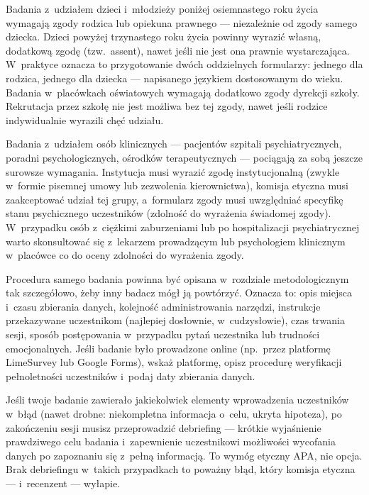 \documentclass[12pt,a4paper,twoside,openany]{book}
\begin{document}
Badania z~udziałem dzieci i~młodzieży poniżej osiemnastego roku życia wymagają zgody rodzica lub opiekuna prawnego --- niezależnie od zgody samego dziecka. Dzieci powyżej trzynastego roku życia powinny wyrazić własną, dodatkową zgodę (tzw.\ assent), nawet jeśli nie jest ona prawnie wystarczająca. W~praktyce oznacza to przygotowanie dwóch oddzielnych formularzy: jednego dla rodzica, jednego dla dziecka --- napisanego językiem dostosowanym do wieku. Badania w~placówkach oświatowych wymagają dodatkowo zgody dyrekcji szkoły. Rekrutacja przez szkołę nie jest możliwa bez tej zgody, nawet jeśli rodzice indywidualnie wyrazili chęć udziału.

Badania z~udziałem osób klinicznych --- pacjentów szpitali psychiatrycznych, poradni psychologicznych, ośrodków terapeutycznych --- pociągają za sobą jeszcze surowsze wymagania. Instytucja musi wyrazić zgodę instytucjonalną (zwykle w~formie pisemnej umowy lub zezwolenia kierownictwa), komisja etyczna musi zaakceptować udział tej grupy, a~formularz zgody musi uwzględniać specyfikę stanu psychicznego uczestników (zdolność do wyrażenia świadomej zgody). W~przypadku osób z~ciężkimi zaburzeniami lub po hospitalizacji psychiatrycznej warto skonsultować się z~lekarzem prowadzącym lub psychologiem klinicznym w~placówce co do oceny zdolności do wyrażenia zgody.

Procedura samego badania powinna być opisana w~rozdziale metodologicznym tak szczegółowo, żeby inny badacz mógł ją powtórzyć. Oznacza to: opis miejsca i~czasu zbierania danych, kolejność administrowania narzędzi, instrukcje przekazywane uczestnikom (najlepiej dosłownie, w~cudzysłowie), czas trwania sesji, sposób postępowania w~przypadku pytań uczestnika lub trudności emocjonalnych. Jeśli badanie było prowadzone online (np.\ przez platformę LimeSurvey lub Google Forms), wskaż platformę, opisz procedurę weryfikacji pełnoletności uczestników i~podaj daty zbierania danych.

\begin{tipbox}
Jeśli twoje badanie zawierało jakiekolwiek elementy wprowadzenia uczestników w~błąd (nawet drobne: niekompletna informacja o~celu, ukryta hipoteza), po zakończeniu sesji musisz przeprowadzić debriefing --- krótkie wyjaśnienie prawdziwego celu badania i~zapewnienie uczestnikowi możliwości wycofania danych po zapoznaniu się z~pełną informacją. To wymóg etyczny APA, nie opcja. Brak debriefingu w~takich przypadkach to poważny błąd, który komisja etyczna --- i~recenzent --- wyłapie.
\end{tipbox}
\end{document}
